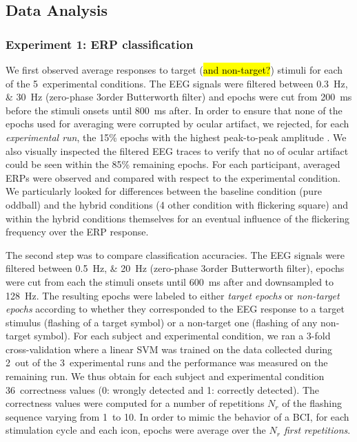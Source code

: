 \documentclass[10pt]{article}
\begin{document}
    \subsection{Data Analysis}
    \label{sec:2.3DataAnalysis}

        \subsubsection{Experiment 1: \acs{ERP} classification}
        \label{sec:2.3.1AnalysisExp1}

        We first observed average responses to target (\hl{and non-target?}) stimuli for each of the 5~experimental conditions.
        The \ac{EEG} signals were filtered between \SIlist[list-units = single]{0.3;30}{\Hz} (zero-phase 3\rd order Butterworth filter) and epochs were cut from \SI{200}{\ms} before the stimuli onsets until \SI{800}{\ms} after.
        In order to ensure that none of the epochs used for averaging were corrupted by ocular artifact, we rejected, for each \emph{experimental run}, the 15\% epochs with the highest peak-to-peak amplitude \parencite{Luck2005}.
        We also visually inspected the filtered \ac{EEG} traces to verify that no of ocular artifact could be seen within the 85\% remaining epochs.
        For each participant, averaged \acp{ERP} were observed and compared with respect to the experimental condition.
        We particularly looked for differences between the baseline condition (pure oddball) and the hybrid conditions (4 other condition with flickering square) and within the hybrid conditions themselves for an eventual influence of the flickering frequency over the \ac{ERP} response.

        The second step was to compare classification accuracies.
        The \ac{EEG} signals were filtered between \SIlist[list-units = single]{0.5;20}{\Hz} (zero-phase 3\rd order Butterworth filter), epochs were cut from each the stimuli onsets until \SI{600}{\ms} after and downsampled to \SI{128}{\Hz}.
        The resulting epochs were labeled to either \emph{target epochs} or \emph{non-target epochs} according to whether they corresponded to the \ac{EEG} response to a target stimulus (flashing of a target symbol) or a non-target one (flashing of any non-target symbol).
        For each subject and experimental condition, we ran a 3-fold cross-validation where a linear \ac{SVM} was trained \parencite{Keerthi2006} on the data collected during 2~out of the 3~experimental runs and the performance was measured on the remaining run.
        We thus obtain for each subject and experimental condition 36~correctness values (0: wrongly detected and 1: correctly detected).
        The correctness values were computed for a number of repetitions $N_r$ of the flashing sequence varying from 1~to 10.
        In order to mimic the behavior of a \ac{BCI}, for each stimulation cycle and each icon, epochs were average over the \emph{$N_r$ first repetitions}.
\end{document}
